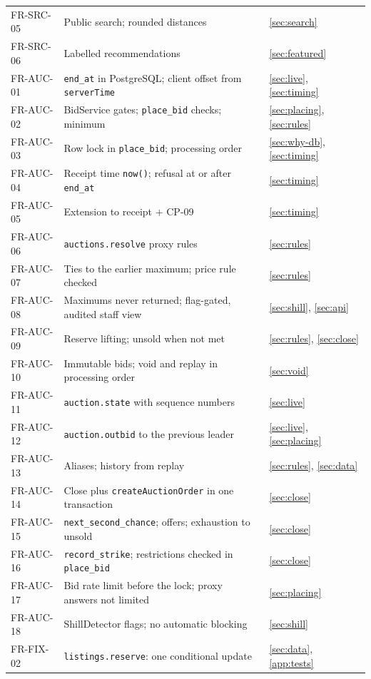 \documentclass[11pt,a4paper]{article}
\begin{document}
{\begin{longtable}{@{}>{\ttfamily}p{2.4cm}>{\raggedright\arraybackslash}p{10.6cm}>{\raggedright\arraybackslash}p{2.2cm}@{}}
FR-SRC-05 & Public search; rounded distances & \ref{sec:search} \\
FR-SRC-06 & Labelled recommendations & \ref{sec:featured} \\
FR-AUC-01 & \texttt{end\_at} in PostgreSQL; client offset from \texttt{serverTime} & \ref{sec:live}, \ref{sec:timing} \\
FR-AUC-02 & BidService gates; \texttt{place\_bid} checks; minimum & \ref{sec:placing}, \ref{sec:rules} \\
FR-AUC-03 & Row lock in \texttt{place\_bid}; processing order & \ref{sec:why-db}, \ref{sec:timing} \\
FR-AUC-04 & Receipt time \texttt{now()}; refusal at or after \texttt{end\_at} & \ref{sec:timing} \\
FR-AUC-05 & Extension to receipt $+$ CP-09 & \ref{sec:timing} \\
FR-AUC-06 & \texttt{auctions.resolve} proxy rules & \ref{sec:rules} \\
FR-AUC-07 & Ties to the earlier maximum; price rule checked & \ref{sec:rules} \\
FR-AUC-08 & Maximums never returned; flag-gated, audited staff view & \ref{sec:shill}, \ref{sec:api} \\
FR-AUC-09 & Reserve lifting; unsold when not met & \ref{sec:rules}, \ref{sec:close} \\
FR-AUC-10 & Immutable bids; void and replay in processing order & \ref{sec:void} \\
FR-AUC-11 & \texttt{auction.state} with sequence numbers & \ref{sec:live} \\
FR-AUC-12 & \texttt{auction.outbid} to the previous leader & \ref{sec:live}, \ref{sec:placing} \\
FR-AUC-13 & Aliases; history from replay & \ref{sec:rules}, \ref{sec:data} \\
FR-AUC-14 & Close plus \texttt{createAuctionOrder} in one transaction & \ref{sec:close} \\
FR-AUC-15 & \texttt{next\_second\_chance}; offers; exhaustion to unsold & \ref{sec:close} \\
FR-AUC-16 & \texttt{record\_strike}; restrictions checked in \texttt{place\_bid} & \ref{sec:close} \\
FR-AUC-17 & Bid rate limit before the lock; proxy answers not limited & \ref{sec:placing} \\
FR-AUC-18 & ShillDetector flags; no automatic blocking & \ref{sec:shill} \\
FR-FIX-02 & \texttt{listings.reserve}: one conditional update & \ref{sec:data}, \ref{app:tests} \\

\end{longtable}}
\end{document}
